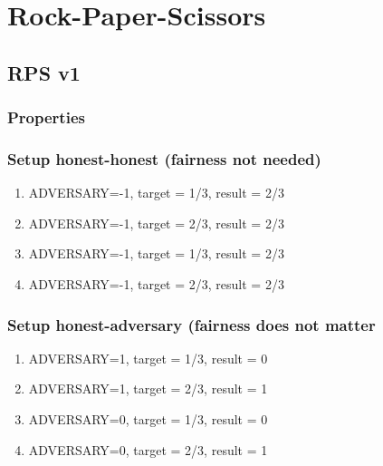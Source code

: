\documentclass{article}
\begin{document}
\javastyle

\tableofcontents

\section{Rock-Paper-Scissors}

\subsection{RPS v1}



\subsubsection{Properties}



\subsubsection{Setup honest-honest (fairness not needed)}

\begin{enumerate}
\item ADVERSARY=-1, target = 1/3, result = 2/3
\item ADVERSARY=-1, target = 2/3, result = 2/3
\item ADVERSARY=-1, target = 1/3, result = 2/3
\item ADVERSARY=-1, target = 2/3, result = 2/3
\end{enumerate}

\subsubsection{Setup honest-adversary (fairness does not matter}

\begin{enumerate}
\item ADVERSARY=1, target = 1/3, result = 0
\item ADVERSARY=1, target = 2/3, result = 1
\item ADVERSARY=0, target = 1/3, result = 0
\item ADVERSARY=0, target = 2/3, result = 1
\end{enumerate}
\end{document}
